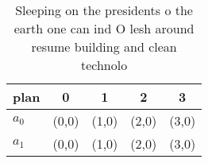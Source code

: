\documentclass[a4paper]{article}
\begin{document}
\begin{table}
\begin{adjustbox}{width=0.5\columnwidth}
\begin{tabular}{|l|l|l|l|l|}
\hline
\textbf{plan} & \multicolumn{1}{c|}{\textbf{0}} & \multicolumn{1}{c|}{\textbf{1}} & \multicolumn{1}{c|}{\textbf{2}} & \multicolumn{1}{c|}{\textbf{3}} \\ \hline
\textbf{$a_0$}  & (0,0) & (1,0) & (2,0) & (3,0) \\ \hline
\textbf{$a_1$}  & (0,0) & (1,0) & (2,0) & (3,0) \\ \hline
\end{tabular}
\end{adjustbox}
\caption{Sleeping on the presidents o the earth one can ind O lesh around resume building and clean technolo
}
\end{table}
\end{document}
